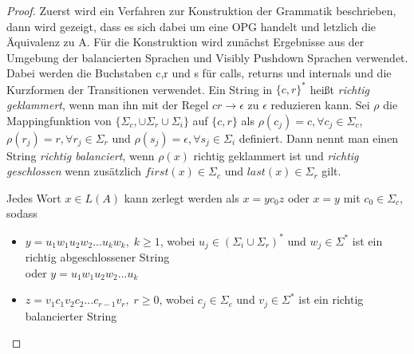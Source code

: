 \begin{proof}
Zuerst wird ein Verfahren zur Konstruktion der Grammatik beschrieben, dann wird gezeigt, dass es sich dabei um eine OPG handelt und letzlich die Äquivalenz zu A.
Für die Konstruktion wird zunächst Ergebnisse aus der Umgebung der balancierten Sprachen und Visibly Pushdown Sprachen verwendet. Dabei werden die Buchstaben c,r und s für calls, returns und internals und die Kurzformen der Transitionen verwendet. Ein String in $\{c, r\}^*$ heißt \textit{richtig geklammert}, wenn man ihn mit der Regel $cr \rightarrow \epsilon$ zu $\epsilon$ reduzieren kann. Sei $\rho$ die Mappingfunktion von $\{\Sigma_c, \cup \Sigma_r \cup \Sigma_i\}$ auf $\{c,r\}$ als $\rho(c_j)=c, \forall c_j\in \Sigma_c$, $\rho(r_j)=r, \forall r_j\in \Sigma_r$ und $\rho(s_j)=\epsilon, \forall s_j\in \Sigma_i$ definiert. Dann nennt man einen String \textit{richtig balanciert}, wenn $\rho(x)$ richtig geklammert ist und \textit{richtig geschlossen} wenn zusätzlich $first(x) \in \Sigma_c$ und $last(x)\in \Sigma_r$ gilt.
\begin{lemma}
\label{factorize}
Jedes Wort $x\in L(A)$ kann zerlegt werden als $x=yc_0z$ oder $x=y$ mit $c_0\in \Sigma_c$, sodass
\begin{itemize}

\item
$y=u_1w_1u_2w_2...u_kw_k, \; k \geq 1$, wobei $u_j \in (\Sigma_i \cup \Sigma_r)^*$ und $w_j \in \Sigma^*$ ist ein richtig abgeschlossener String \\
oder $y=u_1w_1u_2w_2...u_k$
\item
$z=v_1c_1v_2c_2...c_{r-1}v_r, \; r\geq 0$, wobei $c_j \in \Sigma_c$ und $v_j \in \Sigma^*$ ist ein richtig balancierter String
\end{itemize}
\begin{figure}
\label{schema_tree}
\end{figure}
\end{lemma}


\end{proof}
